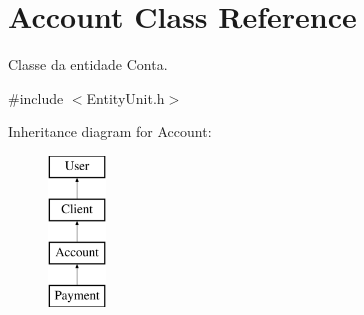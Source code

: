 \hypertarget{classAccount}{\section{Account Class Reference}
\label{classAccount}
}


Classe da entidade Conta.  




{\ttfamily \#include $<$Entity\-Unit.\-h$>$}

Inheritance diagram for Account\-:\begin{figure}[H]
\begin{center}
\leavevmode
\includegraphics[height=4.000000cm]{classAccount}
\end{center}
\end{figure}
